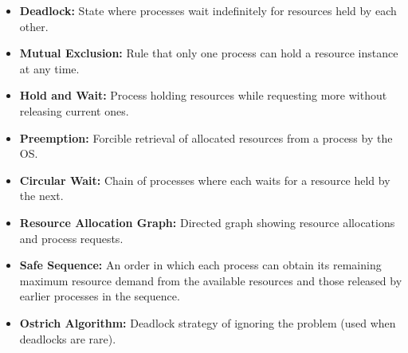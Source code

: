 \documentclass[12pt,a4paper]{article}
\begin{document}
\begin{tcolorbox}[defbox, title={\textbf{One-Line Definitions}}]
\begin{itemize}[leftmargin=*, itemsep=2.5pt, topsep=0pt]
  \item \textbf{Deadlock:} State where processes wait indefinitely for resources held by each other.
  \item \textbf{Mutual Exclusion:} Rule that only one process can hold a resource instance at any time.
  \item \textbf{Hold and Wait:} Process holding resources while requesting more without releasing current ones.
  \item \textbf{Preemption:} Forcible retrieval of allocated resources from a process by the OS.
  \item \textbf{Circular Wait:} Chain of processes where each waits for a resource held by the next.
  \item \textbf{Resource Allocation Graph:} Directed graph showing resource allocations and process requests.
  \item \textbf{Safe Sequence:} An order in which each process can obtain its remaining maximum resource demand from the available resources and those released by earlier processes in the sequence.
  \item \textbf{Ostrich Algorithm:} Deadlock strategy of ignoring the problem (used when deadlocks are rare).
\end{itemize}
\end{tcolorbox}
\end{document}
